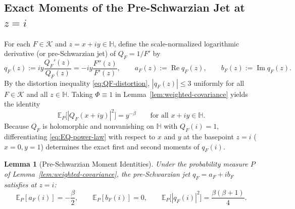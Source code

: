 \documentclass[12pt]{article}
\def\H{\mathbb{H}}
\def\K{\mathcal{K}}
\def\E{\mathbb{E}}
\newtheorem{lemma}[thm]{Lemma}
\theoremstyle{definition}
\numberwithin{equation}{section}
\begin{document}
\subsection{Exact Moments of the Pre-Schwarzian Jet at $z = i$}

For each $F \in \K$ and $z = x+iy \in \H$, define the scale-normalized logarithmic derivative (or pre-Schwarzian jet) of $Q_F = 1/F'$ by
\begin{equation}\label{eq:qF-def}
  q_F(z) := i y \frac{Q_F'(z)}{Q_F(z)} = -i y \frac{F''(z)}{F'(z)}, \qquad a_F(z) := \operatorname{Re} q_F(z), \qquad b_F(z) := \operatorname{Im} q_F(z).
\end{equation}
By the distortion inequality \eqref{eq:QF-distortion}, $|q_F(z)| \le 3$ uniformly for all $F \in \K$ and all $z \in \H$. Taking $\Phi \equiv 1$ in Lemma~\ref{lem:weighted-covariance} yields the identity
\begin{equation}\label{eq:EQ-power-law}
  \E_P\Big[|Q_F(x + iy)|^2\Big] = y^{-\beta} \qquad \text{for all } x + iy \in \H.
\end{equation}
Because $Q_F$ is holomorphic and nonvanishing on $\H$ with $Q_F(i) = 1$, differentiating \eqref{eq:EQ-power-law} with respect to $x$ and $y$ at the basepoint $z = i$ ($x = 0, y = 1$) determines the exact first and second moments of $q_F(i)$.

\begin{lemma}[Pre-Schwarzian Moment Identities]\label{lem:jet-moments}
Under the probability measure $P$ of Lemma~\ref{lem:weighted-covariance}, the pre-Schwarzian jet $q_F = a_F + i b_F$ satisfies at $z = i$:
\begin{equation}\label{eq:jet-moments}
  \E_P[a_F(i)] = -\frac{\beta}{2}, \qquad \E_P[b_F(i)] = 0, \qquad \E_P\Big[|q_F(i)|^2\Big] = \frac{\beta(\beta + 1)}{4}.
\end{equation}
\end{lemma}
\end{document}
